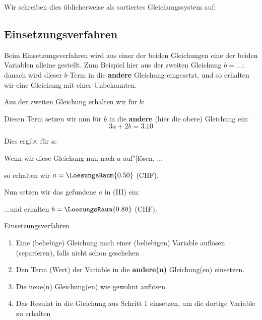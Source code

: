 Wir schreiben dies üblicherweise als sortiertes Gleichungssystem auf:



\subsection{Einsetzungsverfahren}\label{einsetzungsverfahren}
Beim Einsetzungsverfahren wird aus einer der beiden Gleichungen eine der beiden Variablen alleine gestellt. Zum Beispiel hier aus der zweiten Gleichung $b = ...$; danach wird dieser $b$-Term in die \textbf{andere} Gleichung eingesetzt, und so erhalten wir eine Gleichung mit einer Unbekannten.


Aus der zweiten Gleichung erhalten wir für $b$:


Diesen Term setzen wir nun für $b$ in die \textbf{andere} (hier die obere) Gleichung ein:
$$3a+2b = 3.10$$

Dies ergibt für $a$:


Wenn wir diese Gleichung nun nach $a$ auf"|lösen, ...


so erhalten wir $a = \LoesungsRaum{0.50}$ (CHF).


Nun setzen wir das gefundene $a$ in (III) ein:


...und erhalten $b = \LoesungsRaum{0.80}$ (CHF).


\newpage
\begin{rezept}{Einsetzungsverfahren}{}
  \begin{enumerate}

  \item Eine (beliebige) Gleichung nach einer (beliebigen) Variable
    auf\/lösen (separieren), falls nicht schon geschehen
  \item Den Term (Wert) der Variable in die \textbf{andere(n)}
    Gleichung(en) einsetzen.
  \item Die neue(n) Gleichung(en) wie gewohnt auf\/lösen
  \item Das Resulat in die Gleichung aus Schritt 1 einsetzen,
    um die dortige Variable zu erhalten
  \end{enumerate}
\end{rezept}


